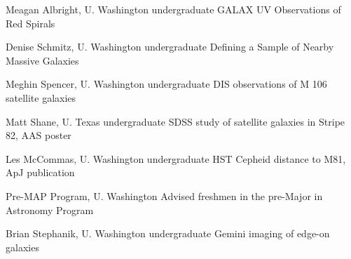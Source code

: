 
\employer{}Meagan Albright, U. Washington undergraduate
GALAX UV Observations of Red Spirals

\employer{}Denise Schmitz, U. Washington undergraduate
Defining a Sample of Nearby Massive Galaxies

\employer{}Meghin Spencer, U. Washington undergraduate
DIS observations of M 106 satellite galaxies

\employer{}Matt Shane, U. Texas undergraduate
SDSS study of satellite galaxies in Stripe 82, AAS poster

\employer{}Les McCommas, U. Washington undergraduate
HST Cepheid distance to M81, ApJ publication

\employer{}Pre-MAP Program, U. Washington
Advised freshmen in the pre-Major in Astronomy Program
 

\employer{}Brian Stephanik, U. Washington undergraduate
Gemini imaging of edge-on galaxies
